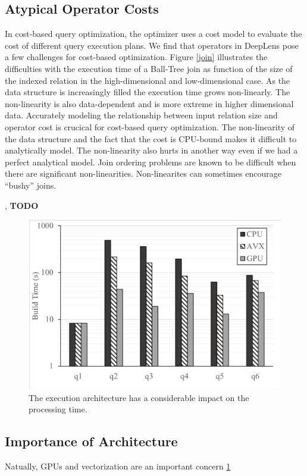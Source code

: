 \subsection{Atypical Operator Costs}
In cost-based query optimization, the optimizer uses a cost model to evaluate the cost of different query execution plans. We find that operators in \textsf{DeepLens} pose a few challenges for cost-based optimization. Figure \ref{join} illustrates the difficulties with the execution time of a Ball-Tree join as function of the size of the indexed relation in the high-dimensional and low-dimensional case. As the data structure is increasingly filled the execution time grows non-linearly. The non-linearity is also data-dependent and is more extreme in higher dimensional data. Accurately modeling the relationship between input relation size and operator cost is crucical for cost-based query optimization. The non-linearity of the data structure and the fact that the cost is CPU-bound makes it difficult to analytically model.
The non-linearity also hurts in another way even if we had a perfect analytical model. Join ordering problems are known to be difficult when there are significant non-linearities. Non-linearites can sometimes encourage ``bushy'' joins.
 
, 
\textbf{TODO}

\begin{figure}[t]
\centering
 \includegraphics[width=\columnwidth]{figures/build.png}
 \caption{The execution architecture has a considerable impact on the processing time.  \label{build} }
\end{figure}

\subsection{Importance of Architecture}
Natually, GPUs and vectorization are an important concern \ref{build}


